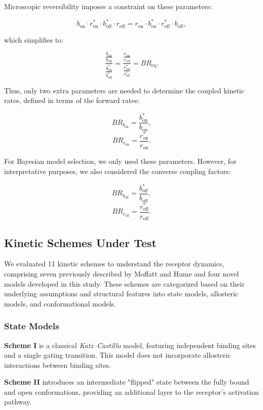 \documentclass[pdflatex,sn-mathphys-num]{sn-jnl}%
\theoremstyle{thmstyleone}%
\theoremstyle{thmstyletwo}%
\theoremstyle{thmstylethree}%
\begin{document}
Microscopic reversibility imposes a constraint on these parameters:

\[
b_{\text{on}} \cdot r^*_{\text{on}} \cdot b^*_{\text{off}} \cdot r_{\text{off}} = r_{\text{on}} \cdot b^*_{\text{on}} \cdot r^*_{\text{off}} \cdot b_{\text{off}},
\]

which simplifies to:

\[
\frac {\frac {b_{\text{on}}}{b_{\text{off}}}}{\frac {b^*_{\text{on}}} {b^*_{\text{off}}}} = \frac {\frac {r_{\text{on}}}{r_{\text{off}}}}{\frac {r^*_{\text{on}}} {r^*_{\text{off}}}} = BR_{\text{eq}}.
\]

Thus, only two extra parameters are needed to determine the coupled kinetic rates, defined in terms of the forward rates:

\[
BR_{b_{\text{on}}} = \frac{b^*_{\text{on}}}{b_{\text{on}}},
\]
\[
BR_{r_{\text{on}}} = \frac{r^*_{\text{on}}}{r_{\text{on}}}.
\]

For Bayesian model selection, we only used these parameters. However, for interpretative purposes, we also considered the converse coupling factors:

\[
BR_{b_{\text{off}}} = \frac{b^*_{\text{off}}}{b_{\text{off}}},
\]
\[
BR_{r_{\text{off}}} = \frac{r^*_{\text{off}}}{r_{\text{off}}}.
\]


\subsection{Kinetic Schemes Under Test}

We evaluated 11 kinetic schemes to understand the receptor dynamics, comprising seven previously described by Moffatt and Hume and four novel models developed in this study. These schemes are categorized based on their underlying assumptions and structural features into state models, allosteric models, and conformational models.

\subsubsection{State Models}

\textbf{Scheme I} is a classical \textit{Katz–Castillo} model, featuring independent binding sites and a single gating transition. This model does not incorporate allosteric interactions between binding sites.

\textbf{Scheme II} introduces an intermediate "flipped" state between the fully bound and open conformations, providing an additional layer to the receptor's activation pathway.
\end{document}
